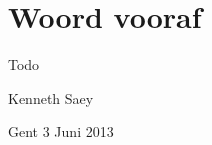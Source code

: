 \newpage


\chapter*{Woord vooraf}


\begin{slshape}

Todo
\npar


\vspace{4ex}

\hfill Kenneth Saey

\hfill Gent 3 Juni 2013

\end{slshape}


